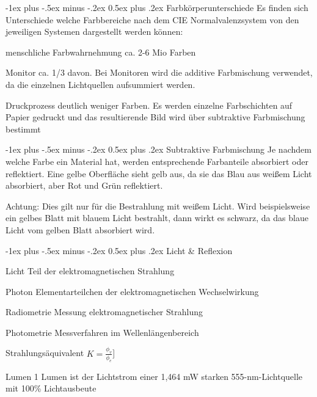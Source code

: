\documentclass[landscape]{article}
\makeatletter
\renewcommand{\section}{\@startsection{section}{1}{0mm}%
                                {-1ex plus -.5ex minus -.2ex}%
                                {0.5ex plus .2ex}%
                                {\normalfont\large\bfseries}}
\makeatother
\begin{document}
\begin{multicols}{3}
  \section{Farbkörperunterschiede}
  Es finden sich Unterschiede welche Farbbereiche nach dem CIE Normalvalenzsystem von den jeweiligen Systemen dargestellt werden können:
  \begin{itemize*}
    \item menschliche Farbwahrnehmung ca. 2-6 Mio Farben
    \item Monitor ca. 1/3 davon. Bei Monitoren wird die additive Farbmischung verwendet, da die einzelnen Lichtquellen aufsummiert werden.
    \item Druckprozess deutlich weniger Farben. Es werden einzelne Farbschichten auf Papier gedruckt und das resultierende Bild wird über subtraktive Farbmischung bestimmt
  \end{itemize*}
  
  \section{Subtraktive Farbmischung}
  Je nachdem welche Farbe ein Material hat, werden entsprechende Farbanteile absorbiert oder reflektiert. Eine gelbe Oberfläche sieht gelb aus, da sie das Blau aus weißem Licht absorbiert, aber Rot und Grün reflektiert.
  
  Achtung: Dies gilt nur für die Bestrahlung mit weißem Licht. Wird beispielsweise ein gelbes Blatt mit blauem Licht bestrahlt, dann wirkt es schwarz, da das blaue Licht vom gelben Blatt absorbiert wird.
  
  \newpage
  \section{Licht \& Reflexion}
  \begin{description*}
    \item[Licht] Teil der elektromagnetischen Strahlung
    \item[Photon] Elementarteilchen der elektromagnetischen Wechselwirkung
    \item[Radiometrie] Messung elektromagnetischer Strahlung
    \item[Photometrie] Messverfahren im Wellenlängenbereich
    \item[Strahlungsäquivalent] $K =\frac{\phi_v}{\phi_e}$]
    \item[Lumen] 1 Lumen ist der Lichtstrom einer 1,464 mW starken 555-nm-Lichtquelle mit 100\% Lichtausbeute
  \end{description*}
  

\end{multicols}
\end{document}
